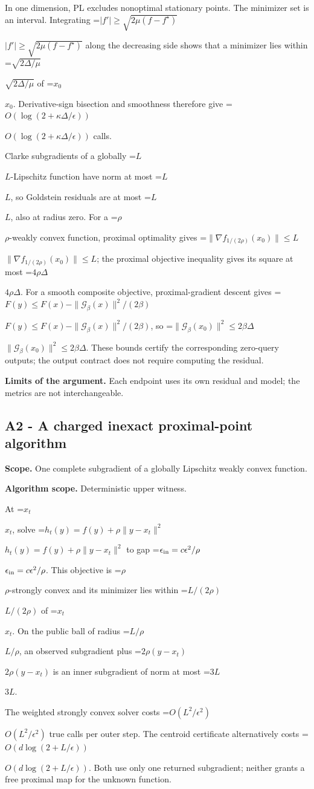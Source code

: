 \documentclass[10pt,a4paper]{article}
\newcommand{\AtlasMath}[1]{\par\begingroup\centering\setbox0=\hbox{$\displaystyle #1$}\ifdim\wd0>1.4\linewidth\typeout{ATLAS WIDE FORMULA: \the\wd0}\fi\ifdim\wd0>\linewidth\resizebox{\linewidth}{!}{\box0}\else\box0\fi\par\endgroup}
\newcommand{\AtlasInlineMath}[1]{\begingroup\setbox0=\hbox{$#1$}\ifdim\wd0>.4\linewidth\endgroup\AtlasMath{#1}\else\endgroup$#1$\fi}
\begin{document}
In one dimension, PL excludes nonoptimal stationary points. The minimizer set is an interval. Integrating
\AtlasInlineMath{|f'|\ge\sqrt{2\mu(f-f^\star)}}
along the decreasing side shows that a minimizer lies within \AtlasInlineMath{\sqrt{2\Delta/\mu}} of \AtlasInlineMath{x_0}. Derivative-sign bisection and smoothness therefore give \AtlasInlineMath{O(\log(2+\kappa\Delta/\epsilon))} calls.

Clarke subgradients of a globally \AtlasInlineMath{L}-Lipschitz function have norm at most \AtlasInlineMath{L}, so Goldstein residuals are at most \AtlasInlineMath{L}, also at radius zero. For a \AtlasInlineMath{\rho}-weakly convex function, proximal optimality gives
\AtlasInlineMath{\|\nabla f_{1/(2\rho)}(x_0)\|\le L}; the proximal objective inequality gives its square at most \AtlasInlineMath{4\rho\Delta}.
For a smooth composite objective, proximal-gradient descent gives
\AtlasInlineMath{F(y)\le F(x)-\|\mathcal G_\beta(x)\|^2/(2\beta)},
so \AtlasInlineMath{\|\mathcal G_\beta(x_0)\|^2\le2\beta\Delta}.
These bounds certify the corresponding zero-query outputs; the output contract does not require computing the residual.

\textbf{Limits of the argument.} Each endpoint uses its own residual and model; the metrics are not interchangeable.

\subsection{A2 - A charged inexact proximal-point algorithm}
\textbf{Scope.} One complete subgradient of a globally Lipschitz weakly convex function.

\textbf{Algorithm scope.} Deterministic upper witness.

At \AtlasInlineMath{x_t}, solve \AtlasInlineMath{h_t(y)=f(y)+\rho\|y-x_t\|^2} to gap
\AtlasInlineMath{\epsilon_{\rm in}=c\epsilon^2/\rho}.
This objective is \AtlasInlineMath{\rho}-strongly convex and its minimizer lies within \AtlasInlineMath{L/(2\rho)} of \AtlasInlineMath{x_t}. On the public ball of radius \AtlasInlineMath{L/\rho}, an observed subgradient plus \AtlasInlineMath{2\rho(y-x_t)} is an inner subgradient of norm at most \AtlasInlineMath{3L}.

The weighted strongly convex solver costs \AtlasInlineMath{O(L^2/\epsilon^2)} true calls per outer step. The centroid certificate alternatively costs \AtlasInlineMath{O(d\log(2+L/\epsilon))}. Both use only one returned subgradient; neither grants a free proximal map for the unknown function.
\end{document}

